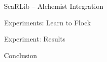 \documentclass[presentation, 9pt]{beamer}\mode<presentation>{\usetheme{AMSBolognaFC}}
\begin{document}
\begin{frame}{ScaRLib -- Alchemist Integration}

\end{frame}

\begin{frame}{Experiments: Learn to Flock}

\end{frame}

\begin{frame}{Experiment: Results}

\end{frame}

\begin{frame}{Conclusion}

\end{frame}

\begin{frame}{}

\end{frame}
\section*{}

\frame{\titlepage}

\section*{\refname}

\begin{frame}{\refname}
	\tiny
	\nocite{*}
	\printbibliography
\end{frame}

\end{document}
